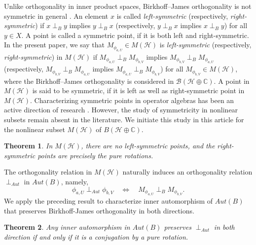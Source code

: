 \documentclass[12pt]{amsart}
\newtheorem{theorem}{Theorem}[section]
\theoremstyle{definition}
\renewcommand{\H}{\mathcal{H}}
\begin{document}
\noindent Unlike orthogonality in inner product spaces, Birkhoff--James orthogonality is not symmetric in general \cite{Sain-normattain}. An element $x$ is called \emph{left-symmetric} (respectively, \emph{right-symmetric}) if $x \perp_B y$ implies $y \perp_B x$ (respectively, $y \perp_B x$ implies $x \perp_B y$) for all $y \in X$. A point is called a symmetric point, if it is both left and right-symmetric. In the present paper, we say that $M_{\phi_{a,U}} \in M(\mathcal{H})$ is \emph{left-symmetric} (respectively, \emph{right-symmetric}) in $M(\mathcal{H})$ if $M_{\phi_{a,U}} \perp_B M_{\phi_{b,V}}$ implies $M_{\phi_{b,V}} \perp_B M_{\phi_{a,U}}$ (respectively, $M_{\phi_{b,V}} \perp_B M_{\phi_{a,U}}$ implies $M_{\phi_{a,U}} \perp_B M_{\phi_{b,V}}$) for all $M_{\phi_{b,V}} \in M(\mathcal{H})$,
where the Birkhoff--James orthogonality is considered in $\mathcal{B}(\mathcal{H} \oplus \mathbb{C})$. A point in $M(\H)$ is said to be symmetric, if it is left as well as right-symmetric point in $M(\H)$. Characterizing symmetric points in operator algebras has been an active direction of research \cite{Mal-Paul-Sain-book,Turnsek, Komuro-Saito-Tanaka}. However, the study of symmetricity in nonlinear subsets remain absent in the literature. We initiate this study in this article for the nonlinear subset $M(\H)$ of $B \left(\H\oplus \mathbb{C} \right)$.
\begin{theorem}\label{thm:left}
In $M(\mathcal{H})$, there are no left-symmetric points, and the right-symmetric points are precisely the pure rotations.
\end{theorem}

\noindent The orthogonality relation in $M(\H)$ naturally induces an orthogonality relation $\perp_{Aut}$ in $Aut(B)$, namely,
\[
\phi_{a,U}\perp_{Aut} \phi_{b,V} \quad \iff \quad M_{\phi_{a,U}}\perp_B M_{\phi_{b,V}}.
\]
We apply the preceding result to characterize inner automorphism of $Aut(B)$ that preserves Birkhoff-James orthogonality in both directions.
\begin{theorem}\label{thm: preserve}
Any inner automorphism in $Aut(B)$ preserves $\perp_{Aut}$ in both direction if and only if it is a conjugation by a pure rotation. 
\end{theorem}
\end{document}
